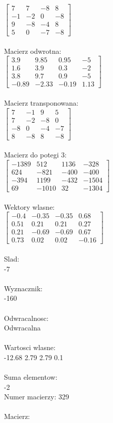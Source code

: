 \documentclass[a4paper,12pt]{article}
\begin{document}
$\begin{bmatrix} 7&7&-8&8\\-1&-2&0&-8\\9&-8&-4&8\\5&0&-7&-8 \end{bmatrix}$
\\
\\
Macierz odwrotna:\\

$\begin{bmatrix} 3.9&9.85&0.95&-5\\1.6&3.9&0.3&-2\\3.8&9.7&0.9&-5\\-0.89&-2.33&-0.19&1.13 \end{bmatrix}$
\\
\\
Macierz transponowana:\\

$\begin{bmatrix} 7&-1&9&5\\7&-2&-8&0\\-8&0&-4&-7\\8&-8&8&-8 \end{bmatrix}$
\\
\\
Macierz do potegi 3:\\

$\begin{bmatrix} -1389&512&1136&-328\\624&-821&-400&-400\\-394&1199&-432&-1504\\69&-1010&32&-1304 \end{bmatrix}$
\\
\\
Wektory wlasne:\\

$\begin{bmatrix} -0.4&-0.35&-0.35&0.68\\0.51&0.21&0.21&0.27\\0.21&-0.69&-0.69&0.67\\0.73&0.02&0.02&-0.16 \end{bmatrix}$
\\
\\
Slad:\\
-7
\\
\\
Wyznacznik:\\
-160
\\
\\
Odwracalnosc:\\
Odwracalna
\\
\\
Wartosci wlasne:\\
-12.68 2.79 2.79 0.1
\\
\\
Suma elementow:\\
-2
\\
\newpage
Numer macierzy:
329
\\
\\
Macierz:\\
\end{document}
